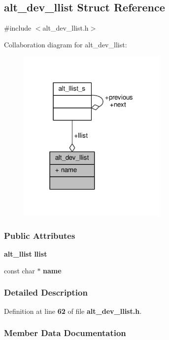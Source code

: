 \subsection{alt\+\_\+dev\+\_\+llist Struct Reference}
\label{structalt__dev__llist}


{\ttfamily \#include $<$alt\+\_\+dev\+\_\+llist.\+h$>$}



Collaboration diagram for alt\+\_\+dev\+\_\+llist\+:
\nopagebreak
\begin{figure}[H]
\begin{center}
\leavevmode
\includegraphics[width=207pt]{d7/d30/structalt__dev__llist__coll__graph}
\end{center}
\end{figure}
\subsubsection*{Public Attributes}
\begin{DoxyCompactItemize}
\item 
{\bf alt\+\_\+llist} {\bf llist}
\item 
const char $\ast$ {\bf name}
\end{DoxyCompactItemize}


\subsubsection{Detailed Description}


Definition at line {\bf 62} of file {\bf alt\+\_\+dev\+\_\+llist.\+h}.



\subsubsection{Member Data Documentation}
